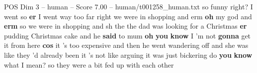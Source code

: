 \begin{textsample}{POS Dim 3 – human – Score 7.00 – human/t001258\_human.txt}  \label{ex:f3_pos_018}
so funny right?
I went so \textbf{er} I went way too far right we were in shopping and erm \textbf{oh} my god and \textbf{erm} so we were in shopping and sh the the dad was looking for a Christmas \textbf{er} pudding Christmas cake and he \textbf{said} to mum \textbf{oh} \textbf{you} \textbf{know} I 'm not \textbf{gonna} get it from here \textbf{cos} it 's too expensive and then he went wandering off and she was like they 'd already been it 's not like arguing it was just bickering do \textbf{you} \textbf{know} what I mean? so they were a bit fed up with each other

\end{textsample}
